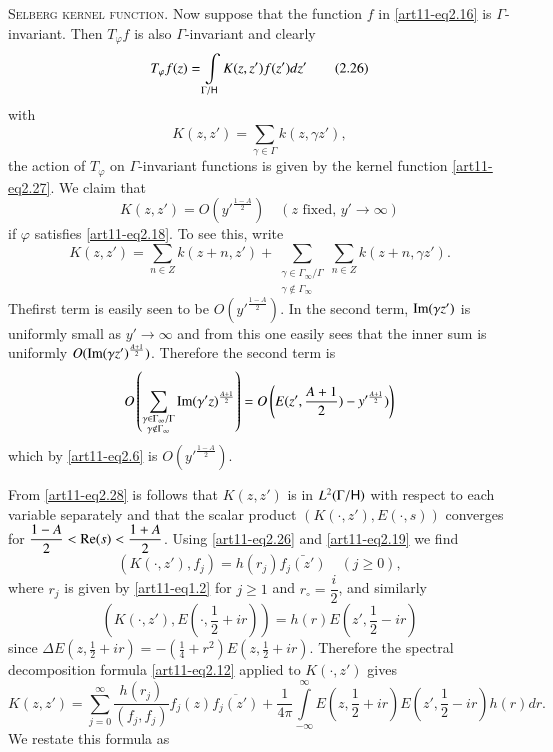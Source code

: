 \medskip
\noindent
\textsc{Selberg kernel function.} Now suppose that the function $f$ in \eqref{art11-eq2.16} is $\Gamma$-invariant. Then $T_\varphi f$  is also $\Gamma$-invariant and clearly
\begin{equation*}
T_\varphi f(z) = \int\limits_{\Gamma / \mathsf{H}} K(z, z') f(z') dz' \tag{2.26}\label{art11-eq2.26}
\end{equation*}
with 
\begin{equation*}
K(z, z') = \sum\limits_{\gamma \in \Gamma} k (z, \gamma z'),  \tag{2.27}\label{art11-eq2.27}
\end{equation*}
\ie the action of $T_\varphi$ on $\Gamma$-invariant functions is given by the kernel function \eqref{art11-eq2.27}. We claim that 
\begin{equation*}
K(z,z') = O(y'^{\frac{1-A}{2}}) \quad  (z \text{ fixed, }y' \longrightarrow \infty) \label{art11-eq2.28}
\end{equation*}
if $\varphi$ satisfies \eqref{art11-eq2.18}. To see this, write 
$$
K(z,z') =  \sum\limits_{n\in Z} k (z + n, z') + \sum\limits_{\substack{\gamma \in \Gamma_\infty / \Gamma \\ \gamma \not\in \Gamma_\infty}} \sum\limits_{n\in Z} k(z+n, \gamma z').
$$
The\pageoriginale first term is easily seen to be $O(y'^{\frac{1-A}{2}})$. In the second term, $\operatorname{Im} (\gamma z')$ is uniformly small as $y' \to \infty$ and from this one easily sees that the inner sum is uniformly $O(\operatorname{Im} (\gamma z')^{\frac{A+1}{2}})$. Therefore the second term is 
$$
O\left(\sum\limits_{\substack{\gamma \in \Gamma_\infty/ \Gamma\\ \gamma \not\in \Gamma_\infty}}  \operatorname{Im} (\gamma' z)^{\frac{A+1}{2}} \right) = O \left(E(z' , \frac{A+1}{2})  - y'^{\frac{A+1}{2}}) \right)
$$
which by \eqref{art11-eq2.6} is $O(y'^{\frac{1-A}{2}})$.

From \eqref{art11-eq2.28} is follows that $K(z, z')$ is in $L^2 (\Gamma / \mathsf{H})$ with respect to each variable separately and that the scalar product $(K(\cdot, z'), E (\cdot, s))$ converges for $\dfrac{1-A}{2} < \operatorname{Re} (s) < \dfrac{1+A}{2}$. Using \eqref{art11-eq2.26} and \eqref{art11-eq2.19} we find 
\begin{equation*}
(K(\cdot, z'), f_j) = h  (r_j ) \bar{f_j(z')} \quad (j \geq 0), \tag{2.29}\label{art11-eq2.29}
\end{equation*}
where $r_j$ is given by \eqref{art11-eq1.2} for $j \geq 1$ and $r_\circ = \dfrac{i}{2}$, and similarly
$$
(K(\cdot, z'), E (\cdot, \frac{1}{2} + ir)) = h (r) E (z', \frac{1}{2} - ir)
$$
since $\Delta E(z, \frac{1}{2} + ir) = - \left(\frac{1}{4} + r^2 \right) E (z, \frac{1}{2} + ir)$. Therefore the spectral decomposition formula \eqref{art11-eq2.12} applied to $K(\cdot, z')$ gives 
$$
K(z, z') = \sum\limits^\infty_{j=0} \frac{h(r_j)}{(f_j , f_j)} f_j (z) \overline{f_j(z')} + \frac{1}{4 \pi} 
\int\limits^\infty_{-\infty} E (z,\frac{1}{2} + ir) E (z' , \frac{1}{2} - ir) h (r) dr. 
$$
We restate this formula as 











